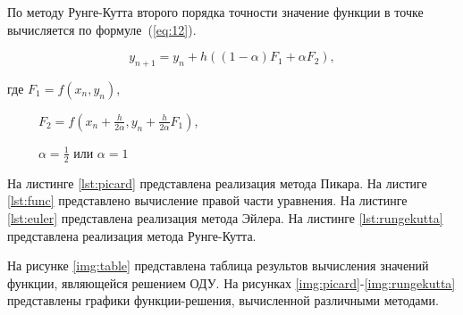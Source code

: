 По методу Рунге-Кутта второго порядка точности значение функции в точке
вычисляется по формуле~(\ref{eq:12}).

\begin{equation}\label{eq:12}
    y_{n+1} = y_n + h((1 - \alpha) F_1 + \alpha F_2),
\end{equation}

где $F_1 = f(x_n, y_n)$,

~~~~~$F_2 = f(x_n + \frac{h}{2\alpha}, y_n + \frac{h}{2\alpha}F_1)$,

~~~~~$\alpha = \frac{1}{2}$ или $\alpha = 1$


На листинге \ref{lst:picard} представлена реализация метода Пикара.
На листиге \ref{lst:func} представлено вычисление правой части уравнения. На
листинге \ref{lst:euler} представлена реализация метода Эйлера.
На листинге \ref{lst:rungekutta} представлена реализация метода Рунге-Кутта.






На рисунке \ref{img:table} представлена таблица результов вычисления
значений функции, являющейся решением ОДУ. На рисунках
\ref{img:picard}-\ref{img:rungekutta}
представлены графики функции-решения, вычисленной различными методами.



